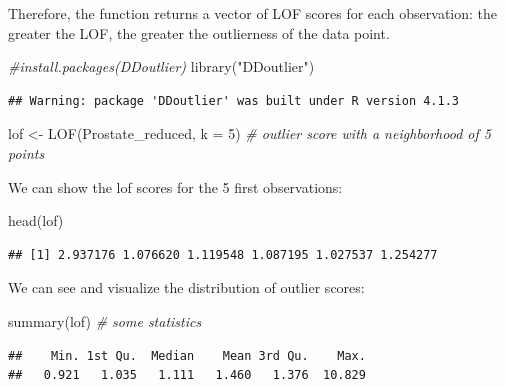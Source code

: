 \documentclass[
]{article}
\newenvironment{Shaded}{\begin{snugshade}}{\end{snugshade}}
\newcommand{\AttributeTok}[1]{\textcolor[rgb]{0.77,0.63,0.00}{#1}}
\newcommand{\CommentTok}[1]{\textcolor[rgb]{0.56,0.35,0.01}{\textit{#1}}}
\newcommand{\DecValTok}[1]{\textcolor[rgb]{0.00,0.00,0.81}{#1}}
\newcommand{\FunctionTok}[1]{\textcolor[rgb]{0.00,0.00,0.00}{#1}}
\newcommand{\NormalTok}[1]{#1}
\newcommand{\OtherTok}[1]{\textcolor[rgb]{0.56,0.35,0.01}{#1}}
\newcommand{\StringTok}[1]{\textcolor[rgb]{0.31,0.60,0.02}{#1}}
\begin{document}
Therefore, the function returns a vector of LOF scores for each
observation: the greater the LOF, the greater the outlierness of the
data point.

\begin{Shaded}
\begin{Highlighting}[]
\CommentTok{\#install.packages(\textquotesingle{}DDoutlier\textquotesingle{})}
\FunctionTok{library}\NormalTok{(}\StringTok{"DDoutlier"}\NormalTok{)}
\end{Highlighting}
\end{Shaded}

\begin{verbatim}
## Warning: package 'DDoutlier' was built under R version 4.1.3
\end{verbatim}

\begin{Shaded}
\begin{Highlighting}[]
\NormalTok{lof }\OtherTok{\textless{}{-}} \FunctionTok{LOF}\NormalTok{(Prostate\_reduced, }\AttributeTok{k =} \DecValTok{5}\NormalTok{) }\CommentTok{\# outlier score with a neighborhood of 5 points}
\end{Highlighting}
\end{Shaded}

We can show the lof scores for the 5 first observations:

\begin{Shaded}
\begin{Highlighting}[]
\FunctionTok{head}\NormalTok{(lof)}
\end{Highlighting}
\end{Shaded}

\begin{verbatim}
## [1] 2.937176 1.076620 1.119548 1.087195 1.027537 1.254277
\end{verbatim}

We can see and visualize the distribution of outlier scores:

\begin{Shaded}
\begin{Highlighting}[]
\FunctionTok{summary}\NormalTok{(lof) }\CommentTok{\# some statistics}
\end{Highlighting}
\end{Shaded}

\begin{verbatim}
##    Min. 1st Qu.  Median    Mean 3rd Qu.    Max. 
##   0.921   1.035   1.111   1.460   1.376  10.829
\end{verbatim}
\end{document}
